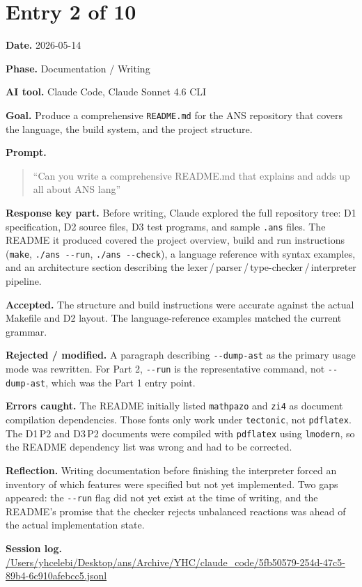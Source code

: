 \documentclass[11pt,a4paper]{article}
\newcommand{\code}[1]{\texttt{#1}}
\newcommand{\field}[2]{\textbf{#1.} #2\par}
\newcommand{\prompt}[1]{%
  \textbf{Prompt.}
  \begin{quote}\small #1\end{quote}
}
\newcommand{\sessionlog}[1]{\textbf{Session log.} \url{#1}\par}
\begin{document}
\section{Entry 2 of 10}
\field{Date}{2026-05-14}
\field{Phase}{Documentation / Writing}
\field{AI tool}{Claude Code, Claude Sonnet 4.6 CLI}
\field{Goal}{Produce a comprehensive \texttt{README.md} for the ANS repository that covers the language, the build system, and the project structure.}
\prompt{``Can you write a comprehensive README.md that explains and adds up all about ANS lang''}
\field{Response key part}{Before writing, Claude explored the full repository tree: D1 specification, D2 source files, D3 test programs, and sample \texttt{.ans} files. The README it produced covered the project overview, build and run instructions (\code{make}, \code{./ans -{}-run}, \code{./ans -{}-check}), a language reference with syntax examples, and an architecture section describing the lexer\,/\,parser\,/\,type-checker\,/\,interpreter pipeline.}
\field{Accepted}{The structure and build instructions were accurate against the actual Makefile and D2 layout. The language-reference examples matched the current grammar.}
\field{Rejected / modified}{A paragraph describing \code{-{}-dump-ast} as the primary usage mode was rewritten. For Part 2, \code{-{}-run} is the representative command, not \code{-{}-dump-ast}, which was the Part 1 entry point.}
\field{Errors caught}{The README initially listed \texttt{mathpazo} and \texttt{zi4} as document compilation dependencies. Those fonts only work under \texttt{tectonic}, not \texttt{pdflatex}. The D1\,P2 and D3\,P2 documents were compiled with \texttt{pdflatex} using \texttt{lmodern}, so the README dependency list was wrong and had to be corrected.}
\field{Reflection}{Writing documentation before finishing the interpreter forced an inventory of which features were specified but not yet implemented. Two gaps appeared: the \code{-{}-run} flag did not yet exist at the time of writing, and the README's promise that the checker rejects unbalanced reactions was ahead of the actual implementation state.}
\sessionlog{/Users/yhcelebi/Desktop/ans/Archive/YHC/claude_code/5fb50579-254d-47c5-89b4-6c910afebcc5.jsonl}

\end{document}
